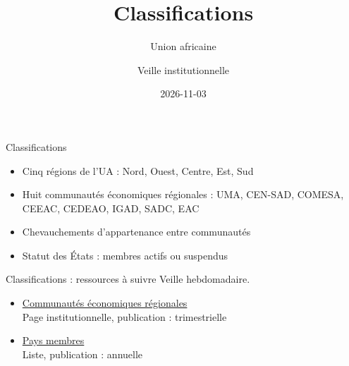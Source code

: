 \documentclass[aspectratio=169,11pt]{beamer}
\title{Classifications}
\subtitle{Union africaine}
\author{Veille institutionnelle}
\date{2026-11-03}
\begin{document}
\begin{frame}\titlepage\end{frame}

\begin{frame}{Classifications}
\begin{itemize}
\item Cinq régions de l'UA : Nord, Ouest, Centre, Est, Sud
\item Huit communautés économiques régionales : UMA, CEN-SAD, COMESA, CEEAC, CEDEAO, IGAD, SADC, EAC
\item Chevauchements d'appartenance entre communautés
\item Statut des États : membres actifs ou suspendus
\end{itemize}
\end{frame}

\begin{frame}{Classifications : ressources à suivre}
\small
Veille hebdomadaire.
\begin{itemize}
\item \href{https://au.int/en/recs}{Communautés économiques régionales}\\{\footnotesize Page institutionnelle, publication : trimestrielle}
\item \href{https://au.int/en/member_states/countryprofiles2}{Pays membres}\\{\footnotesize Liste, publication : annuelle}
\end{itemize}
\end{frame}
\end{document}
